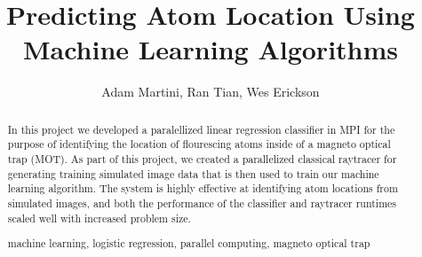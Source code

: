 \documentclass[runningheads,a4paper,11pt]{llncs}
\newcommand{\keywords}[1]{\par\addvspace\baselineskip
\noindent\keywordname\enspace\ignorespaces#1}
\begin{document}
\mainmatter  %

\title{Predicting Atom Location Using \\ Machine Learning Algorithms}


%
%
\author{Adam Martini, Ran Tian, Wes Erickson}


%
%

\maketitle

\begin{abstract}

In this project we developed a paralellized linear regression classifier in MPI for the purpose of identifying the location of flourescing atoms inside of a magneto optical trap (MOT). As part of this project, we created a parallelized classical raytracer for generating training simulated image data that is then used to train our machine learning algorithm. The system is highly effective at identifying atom locations from simulated images, and both the performance of the classifier and raytracer runtimes scaled well with increased problem size.

\keywords{machine learning, logistic regression, parallel computing, magneto optical trap}
\end{abstract}

















\end{document}

